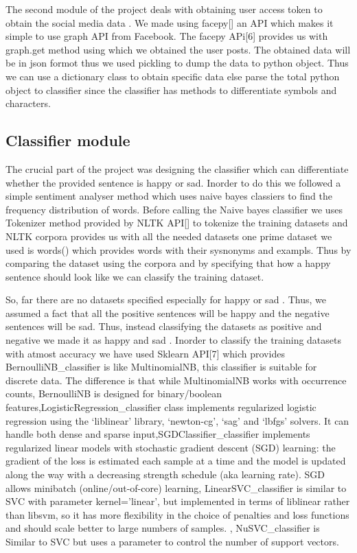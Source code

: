\documentclass{chi2009}
\begin{document}
\begin{Abstract}
The second module of the project deals with obtaining user access token to obtain the social media data . We made using facepy[] an API which makes it simple to use graph API from Facebook. The facepy APi[6] provides us with graph.get method using which we obtained the user posts. The obtained data will be in json formot thus we used pickling to dump the data to python object. Thus we can use a dictionary class to obtain specific data else parse the total python object to classifier since the classifier has methods to differentiate symbols and characters.  




\subsection{Classifier module}

The crucial part of the project was designing the classifier which can differentiate whether the provided sentence is happy or sad. Inorder to do this we followed a simple sentiment analyser method which uses naive bayes classiers to find the frequency distribution of words. Before calling the Naive bayes classifier we uses Tokenizer method provided by NLTK API[] to tokenize the training datasets and NLTK corpora provides us with all the needed datasets one prime dataset we used is words() which provides words with their sysnonyms and exampls. Thus by comparing the dataset using the corpora and by specifying that how a happy sentence should look like we can classify the training dataset. 

So, far there are no datasets specified especially for happy or sad . Thus, we assumed a fact that all the positive sentences will be happy and the negative sentences will be sad. Thus, instead classifying the datasets as positive and negative we made it as happy and sad . Inorder to classify the training datasets with atmost accuracy we have used Sklearn API[7] which provides BernoulliNB_classifier is like MultinomialNB, this classifier is suitable for discrete data. The difference is that while MultinomialNB works with occurrence counts, BernoulliNB is designed for binary/boolean features,LogisticRegression_classifier class implements regularized logistic regression using the ‘liblinear’ library, ‘newton-cg’, ‘sag’ and ‘lbfgs’ solvers. It can handle both dense and sparse input,SGDClassifier_classifier implements regularized linear models with stochastic gradient descent (SGD) learning: the gradient of the loss is estimated each sample at a time and the model is updated along the way with a decreasing strength schedule (aka learning rate). SGD allows minibatch (online/out-of-core) learning, LinearSVC_classifier is similar to SVC with parameter kernel=’linear’, but implemented in terms of liblinear rather than libsvm, so it has more flexibility in the choice of penalties and loss functions and should scale better to large numbers of samples. , NuSVC_classifier is Similar to SVC but uses a parameter to control the number of support vectors. 


\end{Abstract}
\end{document}
